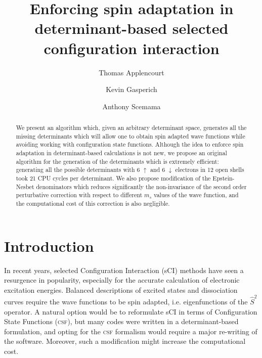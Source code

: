\documentclass[aip,jcp,reprint,showkeys]{revtex4-1}
\newcommand{\stwo}{\hat{S}^2}
\newcommand{\up}{\uparrow}
\newcommand{\dn}{\downarrow}
\newcommand{\csf}{\textsc{csf}}
\begin{document}
\title{Enforcing spin adaptation in determinant-based selected configuration
interaction}

\author{Thomas Applencourt}
\author{Kevin Gasperich}
\author{Anthony Scemama}

\begin{abstract}
We present an algorithm which, given an arbitrary determinant space, generates
all the missing determinants which will allow one to obtain spin adapted
wave functions while avoiding working with configuration state functions.
Although the idea to enforce spin adaptation in determinant-based
calculations is not new, we propose an original algorithm for the generation
of the determinants which is extremely efficient: generating all the possible
determinants with 6 $\up$ and 6 $\dn$ electrons in 12 open shells took 21 CPU
cycles per determinant. We also propose modification of the Epstein-Nesbet
denominators which reduces significantly the non-invariance of the second
order perturbative correction with respect to different $m_s$ values of the
wave function, and the computational cost of this correction is also
negligible.
\end{abstract}


\maketitle

\section{Introduction}

In recent years, selected Configuration Interaction (sCI) methods have seen a resurgence in
popularity,\cite{Greer_1998,Stampfuss_2005,Bytautas_2009,Booth_2009,Giner_2013,Buenker_2014,Holmes_2016,Ohtsuka_2017,Coe_2018}
especially for the accurate calculation of electronic excitation
energies.\cite{Coe_2013,Schriber_2017,Holmes_2017,Loos_2018,Scemama_2018,Dash_2018}
Balanced descriptions of excited states and dissociation curves require
the wave functions to be spin adapted, i.e. eigenfunctions of the $\stwo$
operator. A natural option would be to reformulate sCI in terms of
Configuration State Functions (\csf), but many codes were written in a
determinant-based formulation, and opting for the {\csf} formalism would require
a major re-writing of the software. Moreover, such a modification might
increase the computational cost.\cite{Knowles_1984,Olsen_1988}
\end{document}
